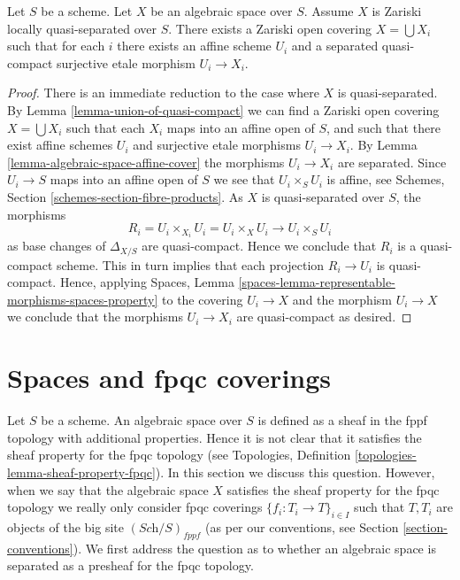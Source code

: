 \begin{lemma}
\label{lemma-quasi-separated-quasi-compact-pieces}
Let $S$ be a scheme.
Let $X$ be an algebraic space over $S$.
Assume $X$ is Zariski locally quasi-separated over $S$.
There exists a Zariski open covering $X = \bigcup X_i$ such
that for each $i$ there exists an affine scheme
$U_i$ and a separated quasi-compact surjective etale
morphism $U_i \to X_i$.
\end{lemma}

\begin{proof}
There is an immediate reduction to the case where $X$ is quasi-separated. By
Lemma \ref{lemma-union-of-quasi-compact}
we can find a Zariski open covering $X = \bigcup X_i$ such that each
$X_i$ maps into an affine open of $S$, and such that there exist affine
schemes $U_i$ and surjective etale morphisms $U_i \to X_i$. By
Lemma \ref{lemma-algebraic-space-affine-cover}
the morphisms $U_i \to X_i$ are separated. Since $U_i \to S$ maps into
an affine open of $S$ we see that $U_i \times_S U_i$ is affine, see
Schemes, Section \ref{schemes-section-fibre-products}.
As $X$ is quasi-separated over $S$, the morphisms
$$
R_i = U_i \times_{X_i} U_i = U_i \times_X U_i
\longrightarrow
U_i \times_S U_i
$$
as base changes of $\Delta_{X/S}$ are quasi-compact. Hence we conclude
that $R_i$ is a quasi-compact scheme. This in turn implies that each
projection $R_i \to U_i$ is quasi-compact. Hence, applying
Spaces, Lemma \ref{spaces-lemma-representable-morphisms-spaces-property}
to the covering $U_i \to X$ and the morphism $U_i \to X$
we conclude that the morphisms $U_i \to X_i$ are quasi-compact as desired.
\end{proof}









\section{Spaces and fpqc coverings}
\label{section-fpqc}

\noindent
Let $S$ be a scheme.
An algebraic space over $S$ is defined as a sheaf in the fppf topology with
additional properties. Hence it is not clear that it satisfies the sheaf
property for the fpqc topology (see
Topologies, Definition \ref{topologies-lemma-sheaf-property-fpqc}).
In this section we discuss this question. However, when we say that
the algebraic space $X$ satisfies the sheaf property for the fpqc topology
we really only consider fpqc coverings $\{f_i : T_i \to T\}_{i \in I}$ such
that $T, T_i$ are objects of the big site $(\textit{Sch}/S)_{fppf}$ (as per
our conventions, see Section \ref{section-conventions}). We first address the
question as to whether an algebraic space is separated as a presheaf for the
fpqc topology.

